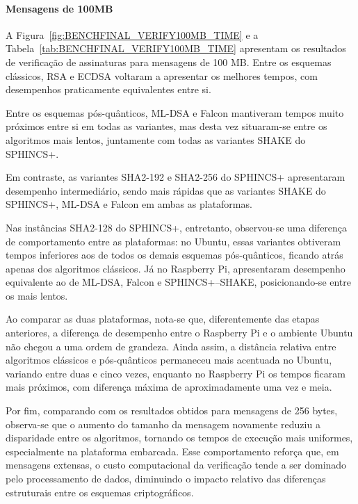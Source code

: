 \paragraph{Mensagens de 100MB}

A Figura~\ref{fig:BENCHFINAL_VERIFY100MB_TIME} e a Tabela~\ref{tab:BENCHFINAL_VERIFY100MB_TIME} apresentam os resultados de verificação de assinaturas para mensagens de 100 MB. Entre os esquemas clássicos, RSA e ECDSA voltaram a apresentar os melhores tempos, com desempenhos praticamente equivalentes entre si. 

Entre os esquemas pós-quânticos, ML-DSA e Falcon mantiveram tempos muito próximos entre si em todas as variantes, mas desta vez situaram-se entre os algoritmos mais lentos, juntamente com todas as variantes SHAKE do SPHINCS+. 

Em contraste, as variantes SHA2-192 e SHA2-256 do SPHINCS+ apresentaram desempenho intermediário, sendo mais rápidas que as variantes SHAKE do SPHINCS+, ML-DSA e Falcon em ambas as plataformas.

Nas instâncias SHA2-128 do SPHINCS+, entretanto, observou-se uma diferença de comportamento entre as plataformas: no Ubuntu, essas variantes obtiveram tempos inferiores aos de todos os demais esquemas pós-quânticos, ficando atrás apenas dos algoritmos clássicos. Já no Raspberry Pi, apresentaram desempenho equivalente ao de ML-DSA, Falcon e SPHINCS+–SHAKE, posicionando-se entre os mais lentos.

Ao comparar as duas plataformas, nota-se que, diferentemente das etapas anteriores, a diferença de desempenho entre o Raspberry Pi e o ambiente Ubuntu não chegou a uma ordem de grandeza. Ainda assim, a distância relativa entre algoritmos clássicos e pós-quânticos permaneceu mais acentuada no Ubuntu, variando entre duas e cinco vezes, enquanto no Raspberry Pi os tempos ficaram mais próximos, com diferença máxima de aproximadamente uma vez e meia.

Por fim, comparando com os resultados obtidos para mensagens de 256 bytes, observa-se que o aumento do tamanho da mensagem novamente reduziu a disparidade entre os algoritmos, tornando os tempos de execução mais uniformes, especialmente na plataforma embarcada. Esse comportamento reforça que, em mensagens extensas, o custo computacional da verificação tende a ser dominado pelo processamento de dados, diminuindo o impacto relativo das diferenças estruturais entre os esquemas criptográficos.


